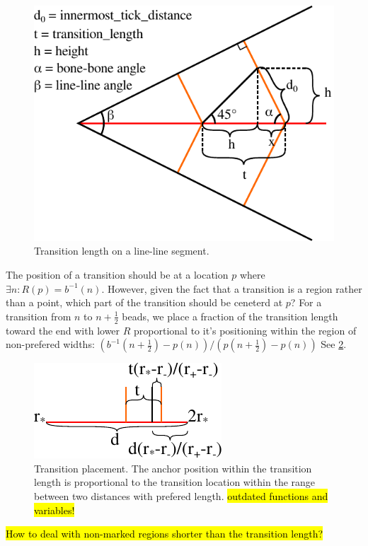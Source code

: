 \begin{figure}
\centering
\includegraphics[width=.75\columnwidth]{sources/method/transition_length_v2.pdf}
\caption{Transition length on a line-line segment.}
\label{transition_length}
\end{figure}

The position of a transition should be at a location $p$ where $\exists n : R(p) = b^{-1}(n)$.
However, given the fact that a transition is a region rather than a point, which part of the transition should be ceneterd at $p$?
For a transition from $n$ to $n+\frac12$ beads, we place a fraction of the transition length toward the end with lower $R$ proportional to it's positioning within the region of non-prefered widths:
$ (b^{-1}(n+\frac12) - p(n) ) / (p(n + \frac12) - p(n))$
See \cref{transition_placement}.


\begin{figure}
\centering
\includegraphics[width=.5\columnwidth]{sources/method/transition_location_precise.pdf}
\caption{Transition placement. The anchor position within the transition length is proportional to the transition location within the range between two distances with prefered length. \hl{outdated functions and variables!}}
\label{transition_placement}
\end{figure}

\hl{How to deal with non-marked regions shorter than the transition length?}



